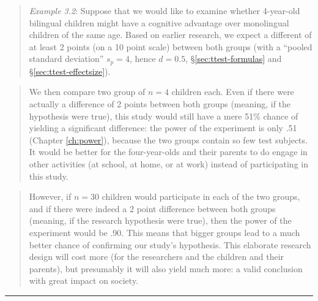 \documentclass[
]{book}
\begin{document}
\begin{quote}
\emph{Example 3.2}: Suppose that we would like to examine whether 4-year-old bilingual children might have a cognitive advantage over monolingual children of the same age. Based on earlier research, we expect a different of at least 2 points (on a 10 point scale) between both groups (with a ``pooled standard deviation'' \(s_p=4\), hence \(d=0.5\), §\ref{sec:ttest-formulas} and §\ref{sec:ttest-effectsize}).
\end{quote}

\begin{quote}
We then compare two group of \(n = 4\) children each. Even if there were actually a difference of 2 points between both groups (meaning, if the hypothesis were true), this study would still have a mere 51\% chance of yielding a significant difference: the power of the experiment is only .51 (Chapter \ref{ch:power}), because the two groups contain so few test subjects. It would be better for the four-year-olds and their parents to do engage in other activities (at school, at home, or at work) instead of participating in this study.
\end{quote}

\begin{quote}
However, if \(n = 30\) children would participate in each of the two groups, and if there were indeed a 2 point difference between both groups (meaning, if the research hypothesis were true), then the power of the experiment would be .90. This means that bigger groups lead to a much better chance of confirming our study's hypothesis. This elaborate research design will cost more (for the researchers and the children and their parents), but presumably it will also yield much more: a valid conclusion with great impact on society.
\end{quote}

\begin{center}\rule{0.5\linewidth}{0.5pt}\end{center}
\end{document}
